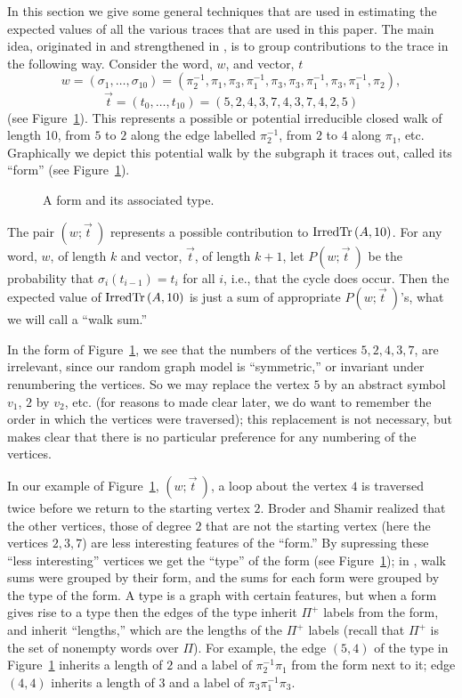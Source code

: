 \documentclass[12pt]{article}
\newcommand{\irdtr}[2]{{\rm IrredTr}\left(#1,#2\right)}
\begin{document}
In this section we give some general techniques that are used in
estimating the expected values of
all the various traces that are used in this paper.
The main idea, originated in \cite{broder} and strengthened in
\cite{friedman_random_graphs}, is to group contributions to the trace 
in the following way.
Consider the word, $w$, and vector, $t$
$$
w=(\sigma_1,\ldots,\sigma_{10})=
(\pi_2^{-1},\pi_1,\pi_3,\pi_1^{-1},\pi_3,\pi_3,\pi_1^{-1},\pi_3,\pi_1^{-1},
\pi_2),
$$
$$
\vec t = (t_0,\ldots,t_{10})=(5,2,4,3,7,4,3,7,4,2,5)
$$
(see Figure~\ref{fg:form1}).
This represents a possible or potential irreducible closed walk of length 10,
from $5$ to $2$ along the edge
labelled $\pi_2^{-1}$, from $2$ to $4$ along $\pi_1$, etc.
Graphically we depict this potential walk by the subgraph it traces out, called
its ``form'' (see Figure~\ref{fg:form1}). 
\begin{figure}
    \centering
        \epsfysize=2.5in
    \caption{A form and its associated type.}
    \label{fg:form1}
\end{figure}
The pair $(w;\vec t\>)$ represents a possible contribution to
$\irdtr{A}{10}$.  For any word, $w$, of length $k$ and vector,
$\vec t$, of length $k+1$, let $P(w;\vec t\>)$ be the probability that
$\sigma_i(t_{i-1})=t_i$ for all $i$, i.e., that the cycle does occur.
Then the expected value of $\irdtr{A}{10}$ is just a sum of appropriate
$P(w;\vec t\>)$'s, what we will call a ``walk sum.''

In the form of Figure~\ref{fg:form1}, we see that the numbers of the 
vertices $5,2,4,3,7$, are irrelevant, since our random graph model is
``symmetric,'' or invariant under renumbering the vertices.  So we
may replace the vertex $5$ by an abstract symbol $v_1$, $2$ by $v_2$,
etc. (for reasons to made clear later, we do want to remember the order
in which the vertices were traversed); this replacement
is not necessary, but
makes clear that there is no particular preference for any numbering
of the vertices.

In our example of Figure~\ref{fg:form1},
$(w;\vec t\>)$, a loop about the vertex $4$ is traversed
twice before we return to the starting vertex $2$.
Broder and Shamir realized that the other vertices, those of degree $2$
that are not the starting vertex (here the vertices $2,3,7$) are less
interesting features of the ``form.'' 
By supressing these ``less interesting'' vertices we get the ``type''
of the form (see Figure~\ref{fg:form1}); in \cite{friedman_random_graphs},
walk sums were grouped by their form, and the sums for each form were
grouped by the type of the form.
A type is a graph with certain
features, but when a form gives rise to a type then the edges
of the type inherit $\Pi^+$ labels from the form, and inherit ``lengths,''
which are the lengths of the $\Pi^+$ labels (recall that $\Pi^+$ is the
set of nonempty words over $\Pi$).
For example, the edge $(5,4)$ of the type in Figure~\ref{fg:form1} inherits
a length of $2$ and a label of $\pi_2^{-1}\pi_1$ from the form next to it;
edge $(4,4)$ inherits a length of $3$ and a label of $\pi_3\pi_1^{-1}\pi_3$.
\end{document}
